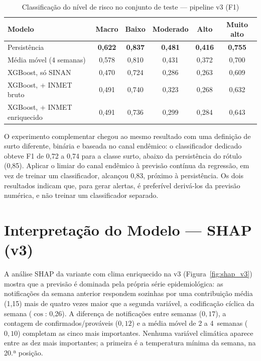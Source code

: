 \begin{apendicesenv}
\begin{table}[htb]
\centering
\caption{Classificação do nível de risco no conjunto de teste --- pipeline v3 (F1)}
\label{tab:risco_v3}
\small
\begin{tabular}{|l|c|c|c|c|c|}
\hline
\textbf{Modelo} & \textbf{Macro} & \textbf{Baixo} & \textbf{Moderado} & \textbf{Alto} & \textbf{Muito alto} \\ \hline
Persistência & \textbf{0,622} & \textbf{0,837} & \textbf{0,481} & \textbf{0,416} & \textbf{0,755} \\ \hline
Média móvel (4 semanas) & 0,578 & 0,810 & 0,431 & 0,372 & 0,700 \\ \hline
XGBoost, só SINAN & 0,470 & 0,724 & 0,286 & 0,263 & 0,609 \\ \hline
XGBoost, + INMET bruto & 0,491 & 0,740 & 0,323 & 0,268 & 0,632 \\ \hline
XGBoost, + INMET enriquecido & 0,491 & 0,736 & 0,299 & 0,284 & 0,643 \\ \hline
\end{tabular}
\end{table}

O experimento complementar chegou ao mesmo resultado com uma definição de surto diferente, binária e baseada no canal endêmico: o classificador dedicado obteve F1 de 0,72 a 0,74 para a classe surto, abaixo da persistência do rótulo (0,85). Aplicar o limiar do canal endêmico à previsão contínua da regressão, em vez de treinar um classificador, alcançou 0,83, próximo à persistência. Os dois resultados indicam que, para gerar alertas, é preferível derivá-los da previsão numérica, e não treinar um classificador separado.

\section{Interpretação do Modelo --- SHAP (v3)}

A análise SHAP da variante com clima enriquecido na v3 (Figura~\ref{fig:shap_v3}) mostra que a previsão é dominada pela própria série epidemiológica: as notificações da semana anterior respondem sozinhas por uma contribuição média (1,15) mais de quatro vezes maior que a segunda variável, a codificação cíclica da semana ($\cos$: 0,26). A diferença de notificações entre semanas ($0{,}17$), a contagem de confirmados/prováveis ($0{,}12$) e a média móvel de 2 a 4~semanas ($0{,}10$) completam as cinco mais importantes. Nenhuma variável climática aparece entre as dez mais importantes; a primeira é a temperatura mínima da semana, na 20.ª posição.


\end{apendicesenv}

